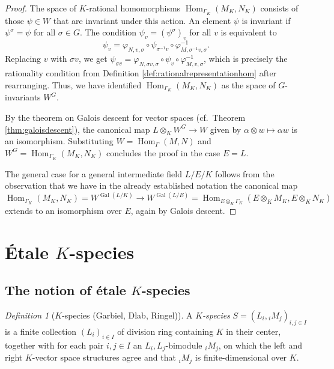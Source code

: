\documentclass[a4paper,12pt,reqno]{amsart}
\DeclareMathOperator{\Hom}{\mathrm{Hom}}
\DeclareMathOperator{\Gal}{\mathrm {Gal}}
\theoremstyle{plain}
\theoremstyle{remark}
\newtheorem{definition}[theorem]{Definition}
\begin{document}
\begin{proof}
    The space of $K$-rational homomorphisms $\Hom_{\Gamma_K}(M_K, N_K)$ consists of those $\psi \in W$ that are invariant under this action. An element $\psi$ is invariant if $\psi^\sigma = \psi$ for all $\sigma \in G$. The condition $\psi_v = (\psi^\sigma)_v$ for all $v$ is equivalent to
    \[
    \psi_v = \varphi_{N,v,\sigma} \circ \psi_{\sigma^{-1}v} \circ \varphi_{M,\sigma^{-1}v,\sigma}^{-1}.
    \]
    Replacing $v$ with $\sigma v$, we get $\psi_{\sigma v} = \varphi_{N,\sigma v,\sigma} \circ \psi_v \circ \varphi_{M,v,\sigma}^{-1}$, which is precisely the rationality condition from Definition \ref{def:rationalrepresentationhom} after rearranging. Thus, we have identified $\Hom_{\Gamma_K}(M_K, N_K)$ as the space of $G$-invariants $W^G$.
    
    By the theorem on Galois descent for vector spaces (cf.\ Theorem \ref{thm:galoisdescent}), the canonical map $L\otimes_K W^G \to W$ given by $\alpha\otimes w \mapsto \alpha w$ is an isomorphism. Substituting $W = \Hom_{\Gamma}(M, N)$ and $W^G = \Hom_{\Gamma_K}(M_K, N_K)$ concludes the proof in the case $E=L$.

    The general case for a general intermediate field $L/E/K$ follows from the observation that we have in the already established notation the canonical map
    \[
    \Hom_{\Gamma_K}(M_K, N_K)=W^{\Gal(L/K)} \to W^{\Gal(L/E)} =\Hom_{E\otimes_K\Gamma_K}(E\otimes_K M_K, E\otimes_K N_K)
    \]
    extends to an isomorphism over $E$, again by Galois descent.
  \end{proof}

  \section{\'Etale $K$-species}
  
  \subsection{The notion of \'etale $K$-species}

  \begin{definition}[{$K$-species (Garbiel, Dlab, Ringel)}]
    A {\em $K$-species} $S=(L_i,{}_iM_j)_{i,j\in I}$ is a finite collection $(L_i)_{i\in I}$ of division ring containing $K$ in their center, together with for each pair $i,j\in I$ an $L_i,L_j$-bimodule ${}_iM_j$, on which the left and right $K$-vector space structures agree and that ${}_iM_j$ is finite-dimensional over $K$.
  \end{definition}
\end{document}
